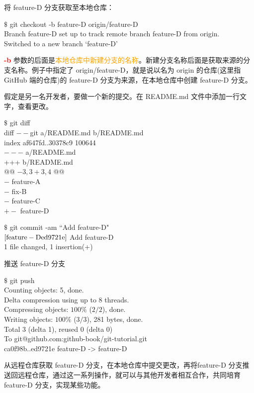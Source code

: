 \documentclass[12pt,a4paper]{article}
\begin{document}
将 feature-D 分支获取至本地仓库：
\begin{tcolorbox}[colback=green!5,colframe=green!40!black,title= ]
$\$$ git checkout -b feature-D origin/feature-D \\
Branch feature-D set up to track remote branch feature-D from origin. \\
Switched to a new branch `feature-D'
\end{tcolorbox}
 \textcolor{red}{\bf -b} 参数的后面是\textcolor{orange}{本地仓库中新建分支的名称}。新建分支名称后面是获取来源的分支名称。例子中指定了 origin/feature-D，就是说以名为 origin 的仓库(这里指 GitHub 端的仓库)的 feature-D 分支为来源，在本地仓库中创建 feature-D 分支。

假定是另一名开发者，要做一个新的提交。在 README.md 文件中添加一行文字，查看更改。
\begin{tcolorbox}[colback=green!5,colframe=green!40!black,title= ]
$\$$ git diff \\
diff $--$git a/README.md b/README.md \\
index af647fd..30378c9 100644 \\
$---$ a/README.md \\
+++ b/README.md \\
@@ $-3,3 +3,4$ @@ \\
$-$ feature-A \\
$-$ fix-B \\
$-$ feature-C \\
$+ -$ feature-D 
\end{tcolorbox}
\begin{tcolorbox}[colback=green!5,colframe=green!40!black,title= ]
$\$$ git commit -am ``Add feature-D" \\
$\rm [feature-D ed9721e]$ Add feature-D \\
1 file changed, 1 insertion(+)
\end{tcolorbox}
推送 feature-D 分支
\begin{tcolorbox}[colback=green!5,colframe=green!40!black,title= ]
$\$$ git push \\
Counting objects: 5, done. \\
Delta compression using up to 8 threads. \\
Compressing objects: $100\%$ ($2/2$), done. \\
Writing objects: $100\%$ ($3/3$), 281 bytes, done. \\
Total 3 (delta 1), reused 0 (delta 0) \\
To git@github.com:github-book/git-tutorial.git \\
ca0f98b..ed9721e feature-D -> feature-D 
\end{tcolorbox}
从远程仓库获取 feature-D 分支，在本地仓库中提交更改，再将feature-D 分支推送回远程仓库，通过这一系列操作，就可以与其他开发者相互合作，共同培育 feature-D 分支，实现某些功能。
\end{document}
